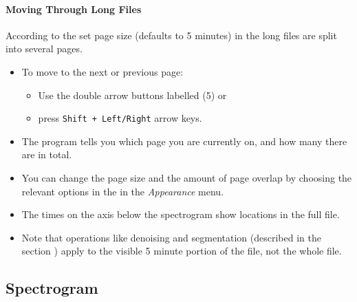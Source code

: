 \documentclass{scrartcl}
\begin{document}
\paragraph{Moving Through Long Files}\label{sec:longfiles}

According to the set page size (defaults to 5 minutes) in the \textit{} long files are split into several pages.

\begin{itemize}
	\item To move to the next or previous page: 
\begin{itemize}
	\item Use the double arrow buttons labelled (5) or
	\item press \texttt{Shift + Left/Right} arrow keys. 
\end{itemize}
	\item The program tells you which page you are currently on, and how many there are in total. 
	\item You can change the page size and the amount of page overlap by choosing the relevant options in the \textit{} in the \textit{Appearance} menu. 
	\item The times on the axis below the spectrogram show locations in the full file.
	\item Note that operations like denoising and segmentation (described in the section ) apply to the visible 5 minute portion of the file, not the whole file.
\end{itemize}


\subsection{Spectrogram}\label{sec:spectrogram}
\end{document}
